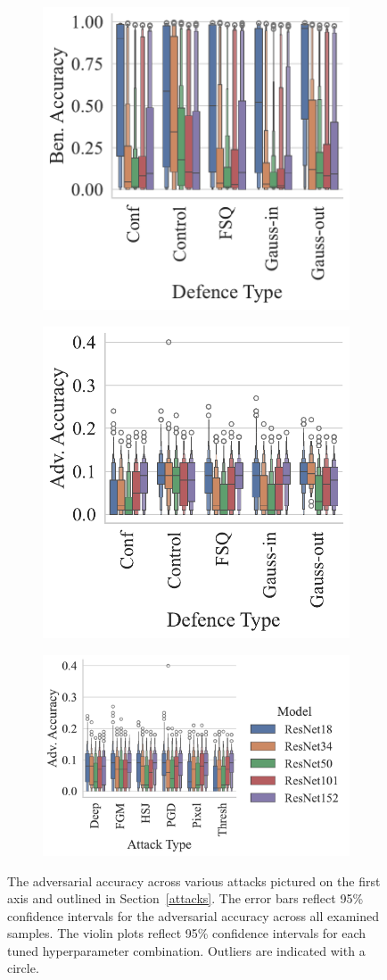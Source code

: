 \label{results}
\begin{figure}[!ht]
\centering
\begin{subfigure}
    \centering
    \includegraphics[trim={7pt 10pt 20pt 0pt},clip,width=.40\textwidth]{plots/ben_accuracy_vs_defence_type.pdf}
\end{subfigure}
\begin{subfigure}
    \centering
    \includegraphics[trim={7pt 10pt 20pt 0pt},clip,width=.40\textwidth]{plots/adv_accuracy_vs_defence_type.pdf}
\end{subfigure}
\begin{subfigure}
    \centering
    \includegraphics[trim={7pt 10pt 20pt 0pt},clip,width=.40\textwidth]{plots/adv_accuracy_vs_attack_type.pdf}
\end{subfigure}
\caption{The adversarial accuracy across various attacks pictured on the first axis and outlined in Section~\ref{attacks}. The error bars reflect 95\% confidence intervals for the adversarial accuracy across all examined samples. The violin plots reflect 95\% confidence intervals for each tuned hyperparameter combination. Outliers are indicated with a circle.}
\label{fig:accuracies}
\end{figure}

